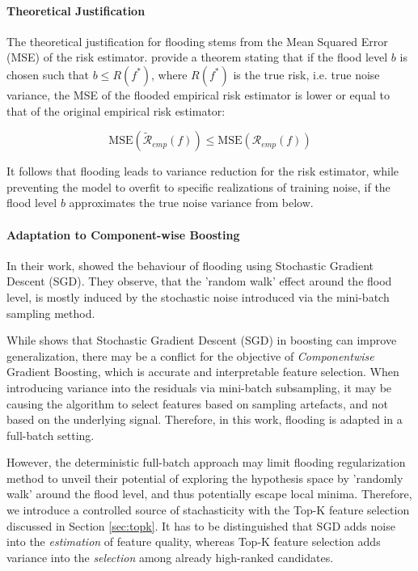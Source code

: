 \documentclass[fontsize=12 pt]{scrartcl}
\begin{document}
\paragraph{Theoretical Justification}

The theoretical justification for flooding stems from the Mean Squared Error (MSE) of the risk estimator. \citet{ishida2020need} provide a theorem stating that if the flood level $b$ is chosen such that $b \leq R(f^*)$, where $R(f^*)$ is the true risk, i.e. true noise variance, the MSE of the flooded empirical risk estimator is lower or equal to that of the original empirical risk estimator:

\begin{equation}
    \text{MSE}(\tilde{\mathcal{R}}_{emp}(f)) \leq \text{MSE}(\mathcal{R}_{emp}(f))
\end{equation}

It follows that flooding leads to variance reduction for the risk estimator, while preventing the model to overfit to specific realizations of training noise, if the flood level $b$ approximates the true noise variance from below.

\paragraph{Adaptation to Component-wise Boosting}

In their work, \citet{ishida2020need} showed the behaviour of flooding using Stochastic Gradient Descent (SGD). They observe, that the 'random walk' effect around the flood level, is mostly induced by the stochastic noise introduced via the mini-batch sampling method. 

While \citet{friedman2002stochastic} shows that Stochastic Gradient Descent (SGD) in boosting can improve generalization, there may be a conflict for the objective of \textit{Componentwise} Gradient Boosting, which is accurate and interpretable feature selection. When introducing variance into the residuals via mini-batch subsampling, it may be causing the algorithm to select features based on sampling artefacts, and not based on the underlying signal. Therefore, in this work, flooding is adapted in a full-batch setting.

However, the deterministic full-batch approach may limit flooding regularization method to unveil their potential of exploring the hypothesis space by 'randomly walk' around the flood level, and thus potentially escape local minima. Therefore, we introduce a controlled source of stachasticity with the Top-K feature selection discussed in Section \ref{sec:topk}. It has to be distinguished that SGD adds noise into the \textit{estimation} of feature quality, whereas Top-K feature selection adds variance into the \textit{selection} among already high-ranked candidates.
\end{document}
